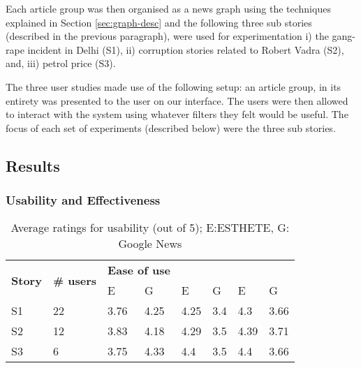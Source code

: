 Each article group was then organised as a news graph using the techniques explained in Section \ref{sec:graph-desc}  %
and the following three sub stories (described in the previous paragraph), were used for experimentation i) the gang-rape incident in Delhi (S1), ii) corruption stories related to Robert Vadra (S2), and, iii) petrol price (S3).

The three user studies made use of the following setup: an article group, in its entirety was presented to the user on our interface. The users were then allowed to interact with the system using whatever filters they felt would be useful. The focus of each set of experiments (described below) were the three sub stories.


\subsection{Results}

\subsubsection{Usability and Effectiveness}
\label{subsec:usability}
\begin{table}
\begin{center}
\small
\begin{tabular}{|p{.69cm}|p{.65cm}|p{.70cm}|p{.70cm}|p{.70cm}|p{.70cm}|p{.70cm}|p{.70cm}|}
\hline
\multirow{2}{*}{{\bf Story}} & \multirow{2}{*}{\parbox{.55cm}{{\bf \# users}}} & \multicolumn{2}{p{1.85cm}|}{{\bf Ease of use}} & \multicolumn{2}{p{1.95cm}|}{\centering{\bf New Information}} & \multicolumn{2}{p{1.55cm}|}{\centering{\bf Big Picture}}\\ 
\cline{3-8} & & E & G & E & G & E & G \\
\hline
S1 & 22 & 3.76 & 4.25 & 4.25 & 3.4 & 4.3 & 3.66\\
S2 & 12 & 3.83 & 4.18 & 4.29 & 3.5 & 4.39 & 3.71 \\
S3 & 6 & 3.75 & 4.33 & 4.4 & 3.5 & 4.4 & 3.66\\
\hline
\end{tabular}
\end{center}
\caption{Average ratings for usability (out of 5); E:ESTHETE, G: Google News}
\label{tab:ease}
\end{table}


